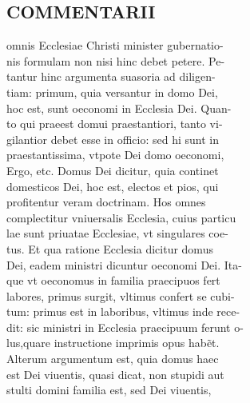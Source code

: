 \documentclass{article}
\begin{document}
\begin{pages}
\section*{COMMENTARII \\
                }omnis Ecclesiae Christi minister gubernatio- \\
                nis formulam non nisi hinc debet petere. Pe- \\
                tantur hinc argumenta suasoria ad diligen- \\
                tiam: primum, quia versantur in domo Dei, \\
                hoc est, sunt oeconomi in Ecclesia Dei. Quan- \\
                to qui praeest domui praestantiori, tanto vi- \\
                gilantior debet esse in officio: sed hi sunt in \\
                praestantissima, vtpote Dei domo oeconomi, \\
                Ergo, etc. Domus Dei dicitur, quia continet \\
                domesticos Dei, hoc est, electos et pios, qui \\
                profitentur veram doctrinam. Hos omnes \\
                complectitur vniuersalis Ecclesia, cuius particu \\
                lae sunt priuatae Ecclesiae, vt singulares coe- \\
                tus. Et qua ratione Ecclesia dicitur domus \\
                Dei, eadem ministri dicuntur oeconomi Dei. Ita- \\
                que vt oeconomus in familia praecipuos fert \\
                labores, primus surgit, vltimus confert se cubi- \\
                tum: primus est in laboribus, vltimus inde rece- \\
                dit: sic ministri in Ecclesia praecipuum ferunt o- \\
                lus,quare instructione imprimis opus habẽt. \\
                Alterum argumentum est, quia domus haec \\
                est Dei viuentis, quasi dicat, non stupidi aut \\
                stulti domini familia est, sed Dei viuentis, \\

\end{pages}
\end{document}

